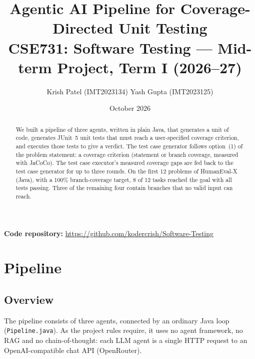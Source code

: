 \documentclass[11pt,a4paper]{article}
\title{\textbf{Agentic AI Pipeline for Coverage-Directed Unit Testing}\\[4pt]
\large CSE731: Software Testing --- Mid-term Project, Term I (2026--27)}
\author{Krish Patel (IMT2023134) \quad Yash Gupta (IMT2023125)}
\date{October 2026}
\begin{document}
\maketitle

\begin{abstract}
We built a pipeline of three agents, written in plain Java, that generates a unit of code, generates JUnit~5 unit tests that must reach a user-specified coverage criterion, and executes those tests to give a verdict. The test case generator follows option~(1) of the problem statement: a coverage criterion (statement or branch coverage, measured with JaCoCo). The test case executor's measured coverage gaps are fed back to the test case generator for up to three rounds. On the first 12 problems of HumanEval-X (Java), with a 100\% branch-coverage target, 8 of 12 tasks reached the goal with all tests passing. Three of the remaining four contain branches that no valid input can reach.
\end{abstract}

\noindent\textbf{Code repository:} \url{https://github.com/kodercrish/Software-Testing}

\section{Pipeline}

\subsection{Overview}
The pipeline consists of three agents, connected by an ordinary Java loop (\texttt{Pipeline.java}). As the project rules require, it uses no agent framework, no RAG and no chain-of-thought: each LLM agent is a single HTTP request to an OpenAI-compatible chat API (OpenRouter).
\end{document}
